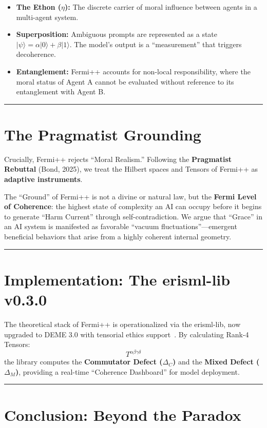 \documentclass[12pt]{article}
\begin{document}
\begin{itemize}
    \item \textbf{The Ethon ($\eta$):} The discrete carrier of moral influence between agents in a multi-agent system.
    \item \textbf{Superposition:} Ambiguous prompts are represented as a state $|\psi\rangle = \alpha|0\rangle + \beta|1\rangle$. The model's output is a ``measurement'' that triggers decoherence.
    \item \textbf{Entanglement:} Fermi++ accounts for non-local responsibility, where the moral status of Agent A cannot be evaluated without reference to its entanglement with Agent B.
\end{itemize}

\bigskip
\hrule
\bigskip

\section{The Pragmatist Grounding}

Crucially, Fermi++ rejects ``Moral Realism.'' Following the \textbf{Pragmatist Rebuttal} (Bond, 2025), we treat the Hilbert spaces and Tensors of Fermi++ as \textbf{adaptive instruments}.

The ``Ground'' of Fermi++ is not a divine or natural law, but the \textbf{Fermi Level of Coherence}: the highest state of complexity an AI can occupy before it begins to generate ``Harm Current'' through self-contradiction. We argue that ``Grace'' in an AI system is manifested as favorable ``vacuum fluctuations''---emergent beneficial behaviors that arise from a highly coherent internal geometry.

\bigskip
\hrule
\bigskip

\section{Implementation: The erisml-lib v0.3.0}

The theoretical stack of Fermi++ is operationalized via the erisml-lib, now upgraded to DEME 3.0 with tensorial ethics support~\cite{bond2026erisml}. By calculating Rank-4 Tensors:
\[
    T^{\alpha\beta\gamma\delta}
\]
the library computes the \textbf{Commutator Defect ($\Delta_C$)} and the \textbf{Mixed Defect ($\Delta_M$)}, providing a real-time ``Coherence Dashboard'' for model deployment.

\bigskip
\hrule
\bigskip

\section{Conclusion: Beyond the Paradox}
\end{document}
